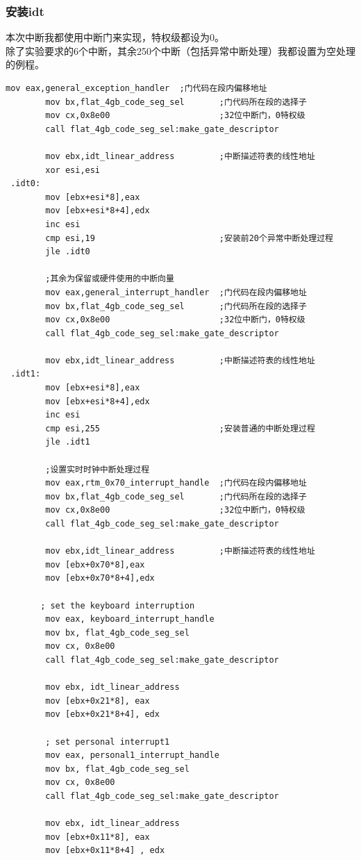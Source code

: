 \documentclass[a4paper,11pt,UTF8]{ctexart}
\begin{document}
		\subsubsection{安装idt}
		本次中断我都使用中断门来实现，特权级都设为0。\\
		\indent 除了实验要求的6个中断，其余250个中断（包括异常中断处理）我都设置为空处理的例程。
	\begin{lstlisting}[caption={安装 IDT},tabsize=4,basicstyle=\footnotesize,captionpos=b]
		mov eax,general_exception_handler  ;门代码在段内偏移地址
		mov bx,flat_4gb_code_seg_sel       ;门代码所在段的选择子
		mov cx,0x8e00                      ;32位中断门，0特权级
		call flat_4gb_code_seg_sel:make_gate_descriptor

		mov ebx,idt_linear_address         ;中断描述符表的线性地址
		xor esi,esi
 .idt0:
		mov [ebx+esi*8],eax
		mov [ebx+esi*8+4],edx
		inc esi
		cmp esi,19                         ;安装前20个异常中断处理过程
		jle .idt0

		;其余为保留或硬件使用的中断向量
		mov eax,general_interrupt_handler  ;门代码在段内偏移地址
		mov bx,flat_4gb_code_seg_sel       ;门代码所在段的选择子
		mov cx,0x8e00                      ;32位中断门，0特权级
		call flat_4gb_code_seg_sel:make_gate_descriptor

		mov ebx,idt_linear_address         ;中断描述符表的线性地址
 .idt1:
		mov [ebx+esi*8],eax
		mov [ebx+esi*8+4],edx
		inc esi
		cmp esi,255                        ;安装普通的中断处理过程
		jle .idt1

		;设置实时时钟中断处理过程
		mov eax,rtm_0x70_interrupt_handle  ;门代码在段内偏移地址
		mov bx,flat_4gb_code_seg_sel       ;门代码所在段的选择子
		mov cx,0x8e00                      ;32位中断门，0特权级
		call flat_4gb_code_seg_sel:make_gate_descriptor

		mov ebx,idt_linear_address         ;中断描述符表的线性地址
		mov [ebx+0x70*8],eax
		mov [ebx+0x70*8+4],edx

	   ; set the keyboard interruption
		mov eax, keyboard_interrupt_handle
		mov bx, flat_4gb_code_seg_sel
		mov cx, 0x8e00
		call flat_4gb_code_seg_sel:make_gate_descriptor

		mov ebx, idt_linear_address
		mov [ebx+0x21*8], eax
		mov [ebx+0x21*8+4], edx

		; set personal interrupt1
		mov eax, personal1_interrupt_handle
		mov bx, flat_4gb_code_seg_sel
		mov cx, 0x8e00
		call flat_4gb_code_seg_sel:make_gate_descriptor

		mov ebx, idt_linear_address
		mov [ebx+0x11*8], eax
		mov [ebx+0x11*8+4] , edx


\end{lstlisting}
\end{document}
